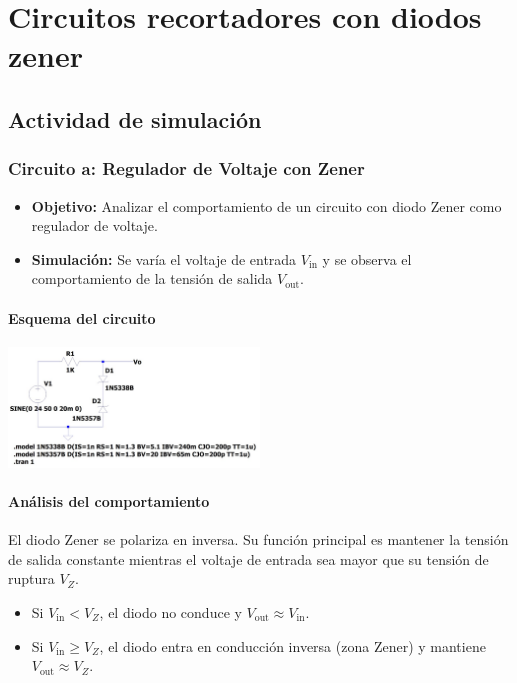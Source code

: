 \documentclass[chaptersright]{informeutn}
\begin{document}
\chapter{Circuitos recortadores con diodos zener}

\section{Actividad de simulación}

\subsection*{Circuito a: Regulador de Voltaje con Zener}

\begin{itemize}
    \item \textbf{Objetivo:} Analizar el comportamiento de un circuito con diodo Zener como regulador de voltaje.
    \item \textbf{Simulación:} Se varía el voltaje de entrada \( V_{\text{in}} \) y se observa el comportamiento de la tensión de salida \( V_{\text{out}} \).
\end{itemize}

\subsubsection*{Esquema del circuito}
\begin{center}
    \includegraphics[width=0.5\textwidth]{pictures/zener_1_circuito.jpeg}
\end{center}

\subsubsection*{Análisis del comportamiento}

El diodo Zener se polariza en inversa. Su función principal es mantener la tensión de salida constante mientras el voltaje de entrada sea mayor que su tensión de ruptura \( V_Z \).

\begin{itemize}
    \item Si \( V_{\text{in}} < V_Z \), el diodo no conduce y \( V_{\text{out}} \approx V_{\text{in}} \).
    \item Si \( V_{\text{in}} \geq V_Z \), el diodo entra en conducción inversa (zona Zener) y mantiene \( V_{\text{out}} \approx V_Z \).
\end{itemize}
\end{document}
